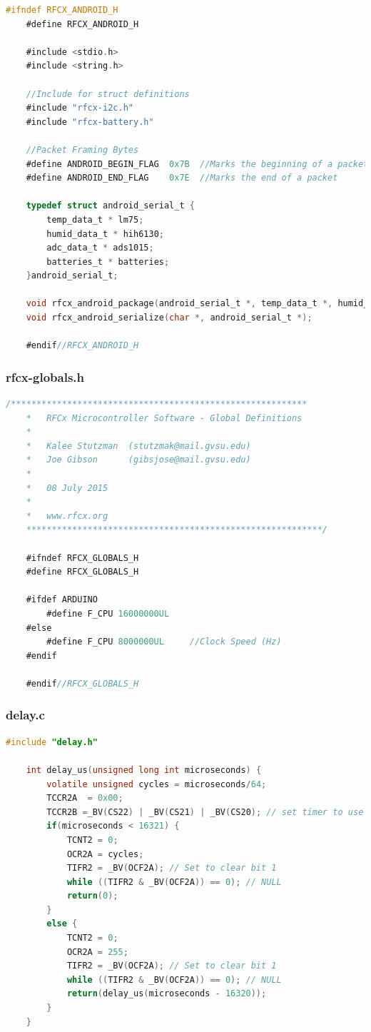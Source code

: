 \documentclass{article}
\numberwithin{figure}{section}
\numberwithin{equation}{section}
\begin{document}
{\begin{lstlisting}[language=C,label=lst:rfcx-android.h,caption=rfcx-android.h]
    #ifndef RFCX_ANDROID_H
    #define RFCX_ANDROID_H

    #include <stdio.h>
    #include <string.h>

    //Include for struct definitions
    #include "rfcx-i2c.h"
    #include "rfcx-battery.h"

    //Packet Framing Bytes
    #define ANDROID_BEGIN_FLAG  0x7B  //Marks the beginning of a packet  //0111 1011
    #define ANDROID_END_FLAG    0x7E  //Marks the end of a packet        //0111 1110

    typedef struct android_serial_t {
        temp_data_t * lm75;
        humid_data_t * hih6130;
        adc_data_t * ads1015;
        batteries_t * batteries;
    }android_serial_t;

    void rfcx_android_package(android_serial_t *, temp_data_t *, humid_data_t *, adc_data_t *, batteries_t *);
    void rfcx_android_serialize(char *, android_serial_t *);

    #endif//RFCX_ANDROID_H
\end{lstlisting}

\subsubsection{rfcx-globals.h}\label{sect:rfcx-globals.h}
\begin{lstlisting}[language=C,label=lst:rfcx-globals.h,caption=rfcx-globals.h]
    /**********************************************************
    *	RFCx Microcontroller Software - Global Definitions
    *
    *	Kalee Stutzman 	(stutzmak@mail.gvsu.edu)
    *	Joe Gibson		(gibsjose@mail.gvsu.edu)
    *
    *	08 July 2015
    *
    *   www.rfcx.org
    **********************************************************/

    #ifndef RFCX_GLOBALS_H
    #define RFCX_GLOBALS_H

    #ifdef ARDUINO
        #define F_CPU 16000000UL
    #else
        #define F_CPU 8000000UL     //Clock Speed (Hz)
    #endif

    #endif//RFCX_GLOBALS_H
\end{lstlisting}

\subsubsection{delay.c}\label{sect:delay.c}
\begin{lstlisting}[language=C,label=lst:delay.c,caption=delay.c]
    #include "delay.h"

    int delay_us(unsigned long int microseconds) {
    	volatile unsigned cycles = microseconds/64;
    	TCCR2A	= 0x00;
    	TCCR2B =_BV(CS22) | _BV(CS21) | _BV(CS20); // set timer to use internal clock with 1:1024 pre-scale
    	if(microseconds < 16321) {
    		TCNT2 = 0;
    		OCR2A = cycles;
    		TIFR2 = _BV(OCF2A); // Set to clear bit 1
    		while ((TIFR2 & _BV(OCF2A)) == 0); // NULL
    		return(0);
    	}
    	else {
    		TCNT2 = 0;
    		OCR2A = 255;
    		TIFR2 = _BV(OCF2A); // Set to clear bit 1
    		while ((TIFR2 & _BV(OCF2A)) == 0); // NULL
    		return(delay_us(microseconds - 16320));
    	}
    }
\end{lstlisting}

}
\end{document}
